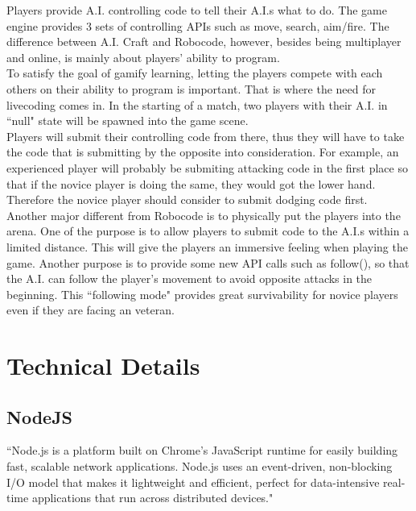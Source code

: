 \documentclass[12pt]{article}
\begin{document}
Players provide A.I. controlling code to tell their A.I.s what to do. The game engine provides 3 sets of controlling APIs such as move, search, aim/fire. The difference between A.I. Craft and Robocode, however, besides being multiplayer and online, is mainly about players' ability to program.\\

To satisfy the goal of gamify learning, letting the players compete with each others on their ability to program is important. That is where the need for livecoding comes in. In the starting of a match, two players with their A.I. in ``null" state will be spawned into the game scene.\\ 

Players will submit their controlling code from there, thus they will have to take the code that is submitting by the opposite into consideration. For example, an experienced player will probably be submiting attacking code in the first place so that if the novice player is doing the same, they would got the lower hand. Therefore the novice player should consider to submit dodging code first.\\ 

Another major different from Robocode is to physically put the players into the arena. One of the purpose is to allow players to submit code to the A.I.s within a limited distance. This will give the players an immersive feeling when playing the game. Another purpose is to provide some new API calls such as follow(), so that the A.I. can follow the player's movement to avoid opposite attacks in the beginning. This ``following mode" provides great survivability for novice players even if they are facing an veteran. 



\section{Technical Details}

\subsection{NodeJS}
``Node.js is a platform built on Chrome's JavaScript runtime for easily building fast, scalable network applications. Node.js uses an event-driven, non-blocking I/O model that makes it lightweight and efficient, perfect for data-intensive real-time applications that run across distributed devices."\cite{nodejs}\\
\end{document}
